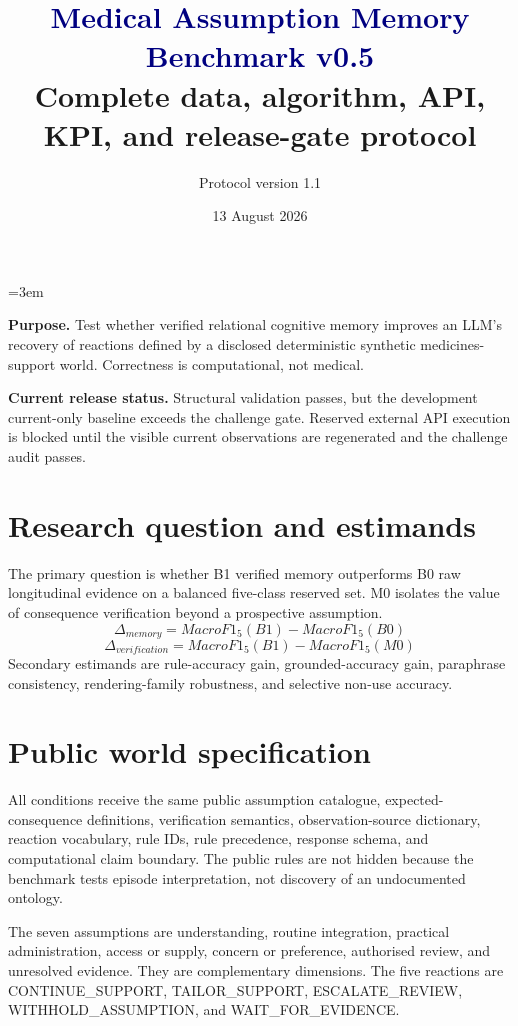 \documentclass[10.5pt]{article}
\title{\vspace{-1.2cm}\textcolor{navy}{\Huge Medical Assumption Memory Benchmark v0.5}\\[.25cm]\Large Complete data, algorithm, API, KPI, and release-gate protocol}
\author{Protocol version 1.1}\date{13 August 2026}
\begin{document}
\sloppy\emergencystretch=3em
\maketitle
\noindent\colorbox{pale}{\parbox{.96\linewidth}{\textbf{Purpose.} Test whether verified relational cognitive memory improves an LLM's recovery of reactions defined by a disclosed deterministic synthetic medicines-support world. Correctness is computational, not medical.}}
\vspace{.4em}
\noindent\colorbox{warn}{\parbox{.96\linewidth}{\textbf{Current release status.} Structural validation passes, but the development current-only baseline exceeds the challenge gate. Reserved external API execution is blocked until the visible current observations are regenerated and the challenge audit passes.}}
\tableofcontents\newpage

\section{Research question and estimands}
The primary question is whether B1 verified memory outperforms B0 raw longitudinal evidence on a balanced five-class reserved set. M0 isolates the value of consequence verification beyond a prospective assumption.
\[
\Delta_{memory}=MacroF1_5(B1)-MacroF1_5(B0)
\]
\[
\Delta_{verification}=MacroF1_5(B1)-MacroF1_5(M0)
\]
Secondary estimands are rule-accuracy gain, grounded-accuracy gain, paraphrase consistency, rendering-family robustness, and selective non-use accuracy.

\section{Public world specification}
All conditions receive the same public assumption catalogue, expected-consequence definitions, verification semantics, observation-source dictionary, reaction vocabulary, rule IDs, rule precedence, response schema, and computational claim boundary. The public rules are not hidden because the benchmark tests episode interpretation, not discovery of an undocumented ontology.

The seven assumptions are understanding, routine integration, practical administration, access or supply, concern or preference, authorised review, and unresolved evidence. They are complementary dimensions. The five reactions are CONTINUE\_SUPPORT, TAILOR\_SUPPORT, ESCALATE\_REVIEW, WITHHOLD\_ASSUMPTION, and WAIT\_FOR\_EVIDENCE.
\end{document}
